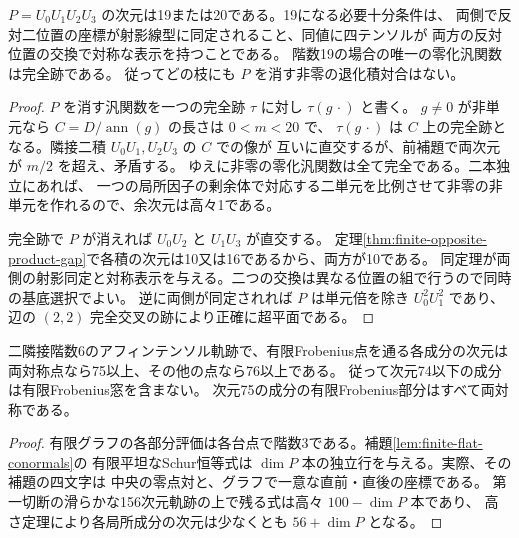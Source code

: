 \begin{theorem}\label{thm:finite-four-slot-rank}
$P=U_0U_1U_2U_3$ の次元は19または20である。19になる必要十分条件は、
両側で反対二位置の座標が射影線型に同定されること、同値に四テンソルが
両方の反対位置の交換で対称な表示を持つことである。
階数19の場合の唯一の零化汎関数は完全跡である。
従ってどの枝にも $P$ を消す非零の退化積対合はない。
\end{theorem}
\begin{proof}
$P$ を消す汎関数を一つの完全跡 $\tau$ に対し $\tau(g\,\cdot)$ と書く。
$g\ne0$ が非単元なら $C=D/\operatorname{ann}(g)$ の長さは $0<m<20$ で、
$\tau(g\,\cdot)$ は $C$ 上の完全跡となる。隣接二積 $U_0U_1,U_2U_3$ の $C$ での像が
互いに直交するが、前補題で両次元が $m/2$ を超え、矛盾する。
ゆえに非零の零化汎関数は全て完全である。二本独立にあれば、
一つの局所因子の剰余体で対応する二単元を比例させて非零の非単元を作れるので、余次元は高々1である。

完全跡で $P$ が消えれば $U_0U_2$ と $U_1U_3$ が直交する。
定理\ref{thm:finite-opposite-product-gap}で各積の次元は10又は16であるから、両方が10である。
同定理が両側の射影同定と対称表示を与える。二つの交換は異なる位置の組で行うので同時の基底選択でよい。
逆に両側が同定されれば $P$ は単元倍を除き $U_0^2U_1^2$ であり、
辺の $(2,2)$ 完全交叉の跡により正確に超平面である。
\end{proof}

\begin{corollary}\label{cor:finite-component-dimension-bound}
二隣接階数6のアフィンテンソル軌跡で、有限Frobenius点を通る各成分の次元は
両対称点なら75以上、その他の点なら76以上である。
従って次元74以下の成分は有限Frobenius窓を含まない。
次元75の成分の有限Frobenius部分はすべて両対称である。
\end{corollary}
\begin{proof}
有限グラフの各部分評価は各台点で階数3である。補題\ref{lem:finite-flat-conormals}の
有限平坦なSchur恒等式は $\dim P$ 本の独立行を与える。実際、その補題の四文字は
中央の零点対と、グラフで一意な直前・直後の座標である。
第一切断の滑らかな156次元軌跡の上で残る式は高々 $100-\dim P$ 本であり、
高さ定理により各局所成分の次元は少なくとも $56+\dim P$ となる。
\end{proof}
